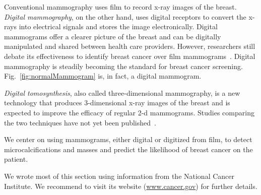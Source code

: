 Conventional mammography uses film to record x-ray images of the breast. \emph{Digital mammography}, on the other hand, uses digital receptors to convert the x-rays into electrical signals and stores the image electronically. Digital mammograms offer a clearer picture of the breast and can be digitally manipulated and shared between health care providers. However, researchers still debate its effectiveness to identify breast cancer over film mammograms~\cite{Kerlikowske2011, Pisano2008, Skaane2007}. Digital mammography is steadily becoming the standard for breast cancer screening. Fig.~\ref{fig:normalMammogram} is, in fact, a digital mammogram.

\emph{Digital tomosynthesis}, also called three-dimensional mammography, is a new technology that produces 3-dimensional x-ray images of the breast and is expected to improve the efficacy of regular 2-d mammograms. Studies comparing the two techniques have not yet been published~\cite{Mammograms2014}.

We center on using mammograms, either digital or digitized from film, to detect microcalcifications and masses and predict the likelihood of breast cancer on the patient.

We wrote most of this section using information from the National Cancer Institute. We recommend to visit its website (\url{www.cancer.gov}) for further details.
